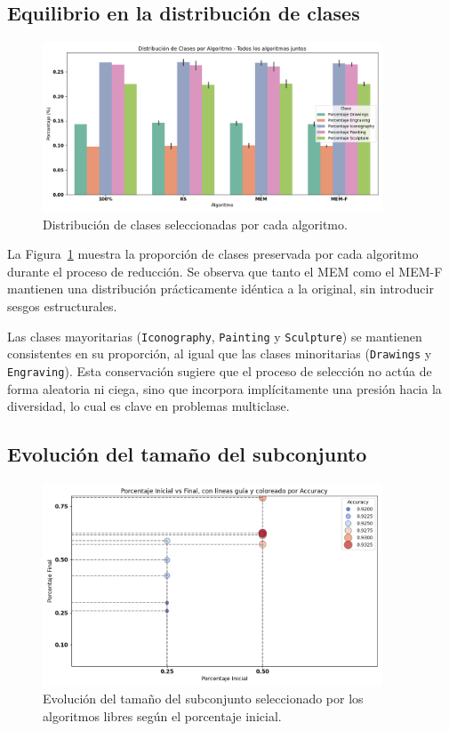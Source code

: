 \subsection{Equilibrio en la distribución de clases}
\begin{figure}[htp]
    \centering
    \includegraphics[width=0.9\textwidth]{imagenes/evaluaciones/painting/balance-de-clases-por-algoritmo}
    \caption{Distribución de clases seleccionadas por cada algoritmo.}
    \label{fig:balance_clases_painting}
\end{figure}

La Figura~\ref{fig:balance_clases_painting} muestra la proporción de clases preservada por cada algoritmo durante el proceso de reducción.
Se observa que tanto el MEM como el MEM-F mantienen una distribución prácticamente idéntica a la original,
sin introducir sesgos estructurales.

Las clases mayoritarias (\texttt{Iconography}, \texttt{Painting} y \texttt{Sculpture}) se mantienen consistentes en su proporción,
al igual que las clases minoritarias (\texttt{Drawings} y \texttt{Engraving}).
Esta conservación sugiere que el proceso de selección no actúa de forma aleatoria ni ciega,
sino que incorpora implícitamente una presión hacia la diversidad, lo cual es clave en problemas multiclase.

\subsection{Evolución del tamaño del subconjunto}
\begin{figure}[htp]
    \centering
    \includegraphics[width=0.9\textwidth]{imagenes/evaluaciones/painting/scatter-por-porcentaje}
    \caption{Evolución del tamaño del subconjunto seleccionado por los algoritmos libres según el porcentaje inicial.}
    \label{fig:evolucion_porcentaje_libre}
\end{figure}

